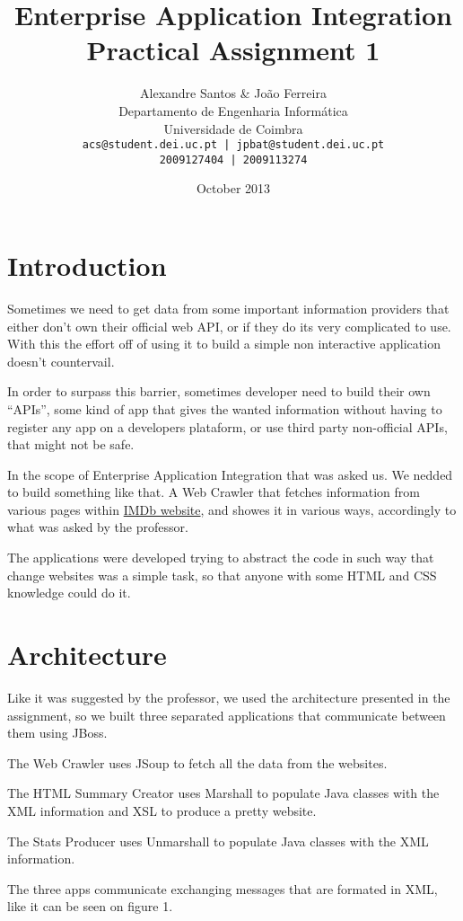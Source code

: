 \documentclass[12pt]{article}
\title{Enterprise Application Integration \\ Practical Assignment 1}
\author{Alexandre Santos \& João Ferreira\\
		Departamento de Engenharia Informática\\
		Universidade de Coimbra\\
		\texttt{acs@student.dei.uc.pt | jpbat@student.dei.uc.pt}\\
		\texttt{2009127404 | 2009113274}}
\date{October 2013}
\begin{document}
\maketitle
\clearpage

\tableofcontents

\setlength{\parindent}{1cm}
\setlength{\parskip}{0.3cm}

\clearpage
\section{Introduction}
\indent \indent Sometimes we need to get data from some important information providers that either don't own their official web API, or if they do its very complicated to use. With this the effort off of using it to build a simple non interactive application doesn't countervail.

In order to surpass this barrier, sometimes developer need to build their own ``APIs'', some kind of app that gives the wanted information without having to register any app on a developers plataform, or use third party non-official APIs, that might not be safe.

In the scope of Enterprise Application Integration that was asked us. We nedded to build something like that. A Web Crawler that fetches information from various pages within \href{http://www.imdb.com}{IMDb website}, and showes it in various ways, accordingly to what was asked by the professor.

The applications were developed trying to abstract the code in such way that change websites was a simple task, so that anyone with some HTML and CSS knowledge could do it.

\clearpage
\section{Architecture}
\indent \indent Like it was suggested by the professor, we used the architecture presented in the assignment, so we built three separated applications that communicate between them using JBoss.

The Web Crawler uses JSoup to fetch all the data from the websites.

The HTML Summary Creator uses Marshall to populate Java classes with the XML information and XSL to produce a pretty website.

The Stats Producer uses Unmarshall to populate Java classes with the XML information.

The three apps communicate exchanging messages that are formated in XML, like it can be seen on figure 1.
\end{document}
